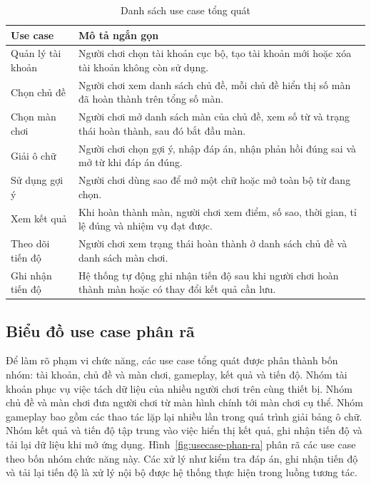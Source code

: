 ﻿\documentclass[../DoAn.tex]{subfiles}
\begin{document}
\begin{table}[H]
\centering
\begin{tabular}{|p{4cm}|p{9.8cm}|}
\hline
\textbf{Use case} & \textbf{Mô tả ngắn gọn} \\ \hline
Quản lý tài khoản & Người chơi chọn tài khoản cục bộ, tạo tài khoản mới hoặc xóa tài khoản không còn sử dụng. \\ \hline
Chọn chủ đề & Người chơi xem danh sách chủ đề, mỗi chủ đề hiển thị số màn đã hoàn thành trên tổng số màn. \\ \hline
Chọn màn chơi & Người chơi mở danh sách màn của chủ đề, xem số từ và trạng thái hoàn thành, sau đó bắt đầu màn. \\ \hline
Giải ô chữ & Người chơi chọn gợi ý, nhập đáp án, nhận phản hồi đúng sai và mở từ khi đáp án đúng. \\ \hline
Sử dụng gợi ý & Người chơi dùng sao để mở một chữ hoặc mở toàn bộ từ đang chọn. \\ \hline
Xem kết quả & Khi hoàn thành màn, người chơi xem điểm, số sao, thời gian, tỉ lệ đúng và nhiệm vụ đạt được. \\ \hline
Theo dõi tiến độ & Người chơi xem trạng thái hoàn thành ở danh sách chủ đề và danh sách màn chơi. \\ \hline
Ghi nhận tiến độ & Hệ thống tự động ghi nhận tiến độ sau khi người chơi hoàn thành màn hoặc có thay đổi kết quả cần lưu. \\ \hline
\end{tabular}
\caption{Danh sách use case tổng quát}
\label{table:usecase_overview}
\end{table}

\subsection{Biểu đồ use case phân rã}
\label{subsection:2.2.2}
Để làm rõ phạm vi chức năng, các use case tổng quát được phân thành bốn nhóm: tài khoản, chủ đề và màn chơi, gameplay, kết quả và tiến độ. Nhóm tài khoản phục vụ việc tách dữ liệu của nhiều người chơi trên cùng thiết bị. Nhóm chủ đề và màn chơi đưa người chơi từ màn hình chính tới màn chơi cụ thể. Nhóm gameplay bao gồm các thao tác lặp lại nhiều lần trong quá trình giải bảng ô chữ. Nhóm kết quả và tiến độ tập trung vào việc hiển thị kết quả, ghi nhận tiến độ và tải lại dữ liệu khi mở ứng dụng. Hình~\ref{fig:usecase-phan-ra} phân rã các use case theo bốn nhóm chức năng này. Các xử lý như kiểm tra đáp án, ghi nhận tiến độ và tải lại tiến độ là xử lý nội bộ được hệ thống thực hiện trong luồng tương tác.
\end{document}

